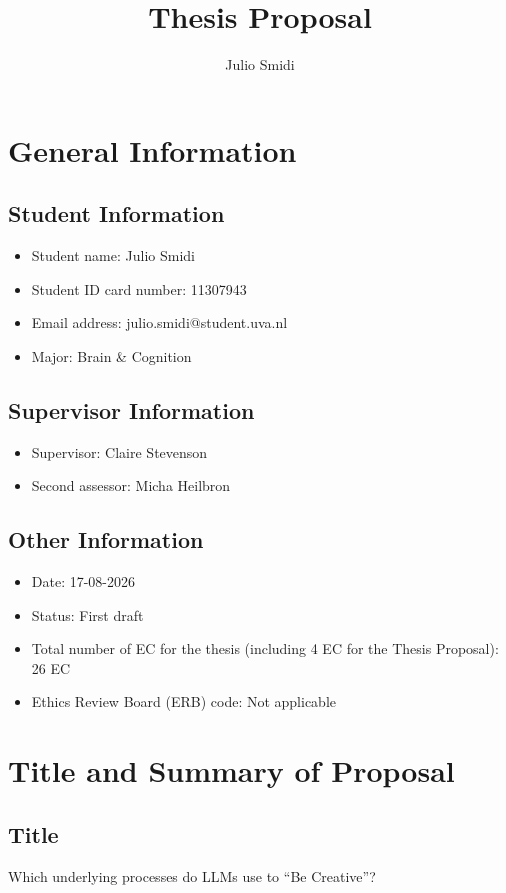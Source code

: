 \documentclass{article}
\title{Thesis Proposal}
\author{Julio Smidi}
\begin{document}
\maketitle

\section{General Information}
\subsection{Student Information}
\begin{itemize}
    \item Student name: Julio Smidi
    \item Student ID card number: 11307943
    \item Email address: julio.smidi@student.uva.nl
    \item Major: Brain \& Cognition
\end{itemize}
\subsection{Supervisor Information}
\begin{itemize}
    \item Supervisor: Claire Stevenson
    \item Second assessor: Micha Heilbron
\end{itemize}
\subsection{Other Information}
\begin{itemize}
    \item Date: 17-08-2026
    \item Status: First draft
    \item Total number of EC for the thesis (including 4 EC for the Thesis Proposal): 26 EC
    \item Ethics Review Board (ERB) code: Not applicable
\end{itemize}

\newpage

\section{Title and Summary of Proposal}
\subsection{Title}
Which underlying processes do LLMs use to “Be Creative”?
\end{document}
